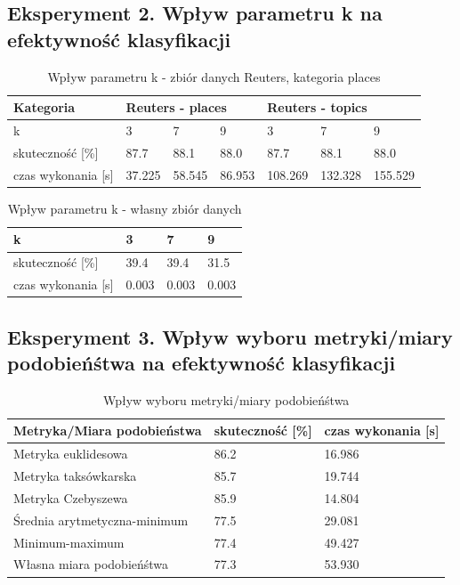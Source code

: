 \documentclass{classrep}
\begin{document}
\subsection{Eksperyment 2. Wpływ parametru k na efektywność klasyfikacji} 
\begin{table}[h]
	\caption{Wpływ parametru k - zbiór danych Reuters, kategoria places}
	\begin{tabular}{l|l|l|l|l|l|l}
		Kategoria& \multicolumn{3}{|l}{ Reuters - places} 	& \multicolumn{3}{|l}{ Reuters - topics}\\
		\hline
		k& 3 & 7 & 9 & 3 & 7 & 9\\
		\hline
		skuteczność [\%]   &87.7&88.1&88.0&87.7&88.1&88.0\\
		czas wykonania [s] &37.225&58.545&86.953&108.269&132.328&155.529\\
	\end{tabular}
\end{table}
\begin{table}[h]
	\centering
	\caption{Wpływ parametru k - własny zbiór danych}
	\begin{tabular}{l|l|l|l}
		k& 3 & 7 & 9 \\
		\hline
		skuteczność [\%]   &39.4&39.4&31.5\\
		czas wykonania [s] &0.003&0.003&0.003\\
	\end{tabular}
\end{table}
\newpage
\subsection{Eksperyment 3. Wpływ wyboru metryki/miary podobieńśtwa na efektywność klasyfikacji}
\begin{table}[h]
	\centering
	\caption{Wpływ wyboru metryki/miary podobieńśtwa}
	\begin{tabular}{l|l|l}
		Metryka/Miara podobieństwa& skuteczność [\%] & czas wykonania [s]\\
		\hline
		Metryka euklidesowa&86.2&16.986\\
		Metryka taksówkarska&85.7&19.744\\
		Metryka Czebyszewa&85.9&14.804\\
		Średnia arytmetyczna-minimum&77.5&29.081\\
		Minimum-maximum&77.4&49.427\\
		Własna miara podobieńśtwa&77.3&53.930\\
	\end{tabular}
\end{table}
\end{document}

